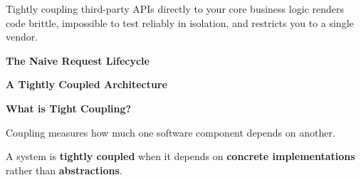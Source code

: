 \documentclass[11pt]{article}
\begin{document}
\vspace{0.25in}

Tightly coupling third-party APIs directly to your core business logic renders code brittle, impossible to test reliably in isolation, and restricts you to a single vendor.

\newpage

\vspace*{1.2in}

\begin{center}
{\Large\bfseries The Naive Request Lifecycle}
\end{center} %


\vspace*{0.2in}

\begin{center}
{\fontsize{26}{30}\selectfont\color{brandnavy}\bfseries
A Tightly Coupled Architecture}

\end{center}

\vspace{0.35in}

{\Large\color{brandnavy}\textbf{What is Tight Coupling?}}

\vspace{0.15in}

{\large
Coupling measures how much one software component
depends on another.
}

\vspace{0.15in}

{\large
A system is \textbf{tightly coupled} when it depends on
\textbf{concrete implementations} rather than
\textbf{abstractions}.
}

\vspace{0.45in}

\end{document}
